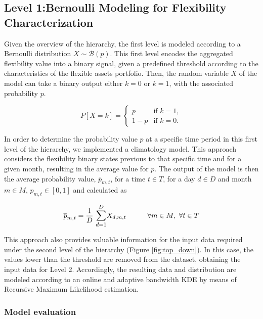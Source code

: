 \subsection{Level 1:Bernoulli Modeling for Flexibility Characterization}\label{sect:Level1}
Given the overview of the hierarchy, the first level is modeled according to a Bernoulli distribution $X \sim \mathcal{B}(p)$. This first level encodes the aggregated flexibility value into a binary signal, given a predefined threshold according to the characteristics of the flexible assets portfolio. Then, the random variable $X$  of the model can take a binary output either $k=0$ or $k=1$, with the associated probability $p$.

\begin{equation}
  P[X = k] =
  \begin{cases} 
    p     & \text{if $k = 1$}, \\
    1 - p & \text{if $k = 0$}.
  \end{cases}
\end{equation}


In order to determine the probability value $p$ at a specific time period in this first level of the hierarchy, we implemented a climatology model. This approach considers the flexibility binary states previous to that specific time and for a given month, resulting in the average value for $p$. The output of the model is then the average probability value,  $\overline{p}_{m,t}$,  for a time $t \in T$, for a day $d \in D$ and month $m \in M$, $p_{m,t} \in [0,1]$ and calculated as 

\begin{equation}
    \overline{p}_{m,t} = \frac{1}{D} \ \mathlarger{\sum_{d=1}^{D}} X_{d,m,t} \hspace{30pt} \forall m \in M, \ \forall t \in T
\end{equation}

This approach also provides valuable information for the input data required under the second level of the hierarchy (Figure \ref{fig:top_down}). In this case, the values lower than the threshold are removed from the dataset, obtaining the input data for Level 2. Accordingly, the resulting data and distribution are modeled according to an online and adaptive bandwidth KDE by means of Recursive Maximum Likelihood estimation.


\subsubsection{Model evaluation}

